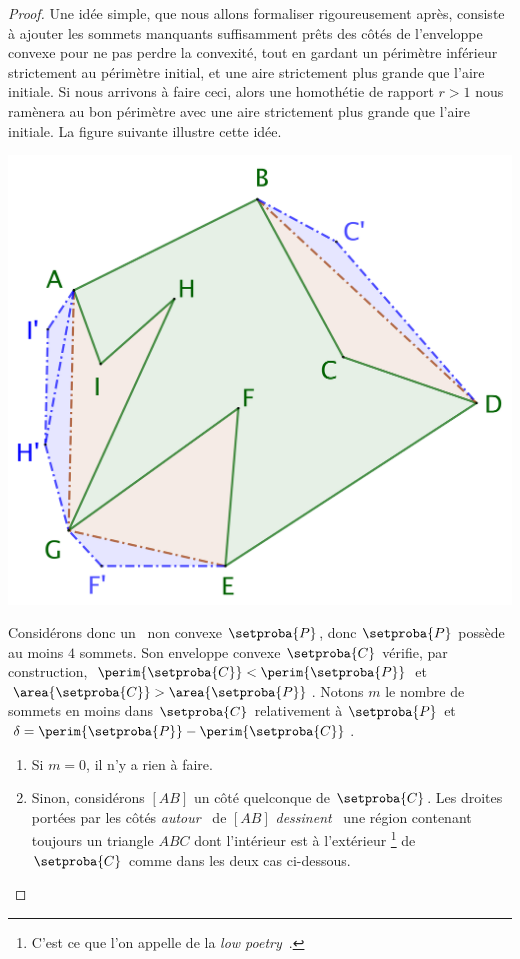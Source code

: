 \begin{proof}
	Une idée simple, que nous allons formaliser rigoureusement après, consiste à ajouter les sommets manquants suffisamment prêts des côtés de l'enveloppe convexe pour ne pas perdre la convexité, tout en gardant un périmètre inférieur strictement au périmètre initial, et une aire strictement plus grande que l'aire initiale. Si nous arrivons à faire ceci, alors une homothétie de rapport $r > 1$ nous ramènera au bon périmètre avec une aire strictement plus grande que l'aire initiale.
	La figure suivante illustre cette idée.	
	
	\begin{center}
		\includegraphics[scale=.4]{content/polygon/necessary-cond/convex-hull-distortion.png}
	\end{center}


	Considérons donc un \ngone\ non convexe $\setproba{P}$, donc $\setproba{P}$ possède au moins $4$ sommets.
	Son enveloppe convexe $\setproba{C}$ vérifie, par construction,
	$\perim{\setproba{C}} < \perim{\setproba{P}}$ 
	et 
	$\area{\setproba{C}} > \area{\setproba{P}}$.
	Notons $m$ le nombre de sommets en moins dans $\setproba{C}$ relativement à $\setproba{P}$ et
	$\delta = \perim{\setproba{P}} - \perim{\setproba{C}}$.
	\begin{enumerate}
		\item \label{add-vertex-start}
		Si $m = 0$, il n'y a rien à faire. 

		\item Sinon, considérons $[AB]$ un côté quelconque de $\setproba{C}$.
		Les droites portées par les côtés \og \emph{autour} \fg\ de $[AB]$ \og \emph{dessinent} \fg\ une région contenant toujours un triangle $ABC$ dont l'intérieur est à l'extérieur
		\footnote{
			C'est ce que l'on appelle de la \og \emph{low poetry} \fg\,.
		}
		de $\setproba{C}$ comme dans les deux cas ci-dessous.
		\begin{multicols}{2}
			\centering


\end{multicols}
\end{enumerate}
\end{proof}
